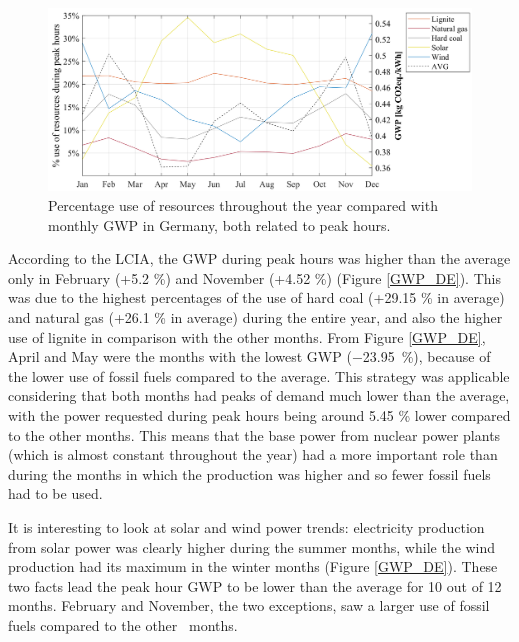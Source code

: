{{\begin{figure}[htbp]
	\centering
	\includegraphics[width=1\textwidth]{ChapterLCA/Images/GWP_plots/COMP_GWP_DE.png}
	\caption{Percentage use of resources throughout the year compared with monthly GWP in Germany, both related to peak hours.}
	\label{COMP_GE}
\end{figure}

\newpage
According to the LCIA, the GWP during peak hours was higher than the average only in  February {(+5.2 \%)} and November {(+4.52 \%)} (Figure \ref{GWP_DE}). This was due to the highest percentages of the use of hard coal {(+29.15 \% in average)} and natural gas {(+26.1 \% in average)} during the entire year, and also the higher use of lignite in comparison with the other months. From Figure \ref{GWP_DE}, April and May were the months with the lowest GWP {($-$23.95~\%)}, because of the lower use of fossil fuels compared to the average. This strategy was applicable considering that both months had peaks of demand much lower than the average, {with the power requested during peak hours being around 5.45 \% lower compared to the other months}. This means that the base power from nuclear power plants (which is almost constant throughout the year) had a more important role than during the months in which the production was higher and so fewer fossil fuels had to be used. 

It is interesting to look at solar and wind power trends: electricity production from solar power was clearly higher during the summer months, while the wind production had its maximum in the winter months (Figure \ref{GWP_DE}). These two facts lead the peak hour GWP to be lower than the average  for 10 out of 12 months. February and November, the two exceptions, saw a larger use of fossil fuels compared to the {other}%
~months. 


}}
